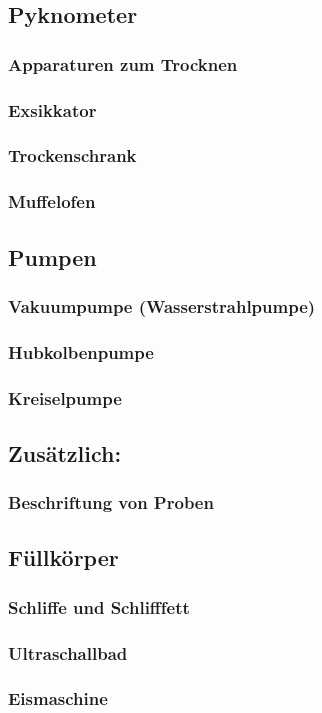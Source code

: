 \subsection{Pyknometer}

\subsubsection{Apparaturen zum Trocknen}
\subsubsection{Exsikkator}
\subsubsection{Trockenschrank}
\subsubsection{Muffelofen}

\subsection{Pumpen}
\subsubsection{Vakuumpumpe (Wasserstrahlpumpe)}
\subsubsection{Hubkolbenpumpe}
\subsubsection{Kreiselpumpe}

\subsection{Zusätzlich:}
\subsubsection{Beschriftung von Proben}
\subsection{Füllkörper}
\subsubsection{Schliffe und Schlifffett}
\subsubsection{Ultraschallbad}
\subsubsection{Eismaschine}